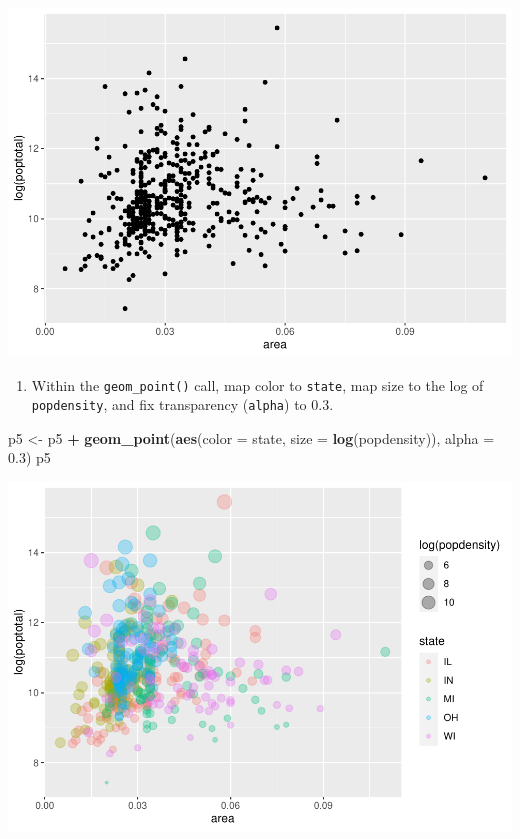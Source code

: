 \documentclass[
]{book}
\newenvironment{Shaded}{\begin{snugshade}}{\end{snugshade}}
\newcommand{\DataTypeTok}[1]{\textcolor[rgb]{0.13,0.29,0.53}{#1}}
\newcommand{\FloatTok}[1]{\textcolor[rgb]{0.00,0.00,0.81}{#1}}
\newcommand{\KeywordTok}[1]{\textcolor[rgb]{0.13,0.29,0.53}{\textbf{#1}}}
\newcommand{\NormalTok}[1]{#1}
\newcommand{\OperatorTok}[1]{\textcolor[rgb]{0.81,0.36,0.00}{\textbf{#1}}}
\newcommand{\StringTok}[1]{\textcolor[rgb]{0.31,0.60,0.02}{#1}}
\providecommand{\tightlist}{%
  \setlength{\itemsep}{0pt}\setlength{\parskip}{0pt}}
\begin{document}
\begin{alert}
\includegraphics{R/Rgraphics/figures/unnamed-chunk-228-1.pdf}

\begin{enumerate}
\def\labelenumi{\arabic{enumi}.}
\setcounter{enumi}{1}
\tightlist
\item
  Within the \texttt{geom\_point()} call, map color to \texttt{state}, map size to the log of \texttt{popdensity}, and fix transparency (\texttt{alpha}) to 0.3.
\end{enumerate}

\begin{Shaded}
\begin{Highlighting}[]
\NormalTok{p5 \textless{}{-}}\StringTok{ }\NormalTok{p5 }\OperatorTok{+}\StringTok{ }\KeywordTok{geom\_point}\NormalTok{(}\KeywordTok{aes}\NormalTok{(}\DataTypeTok{color =}\NormalTok{ state, }\DataTypeTok{size =} \KeywordTok{log}\NormalTok{(popdensity)), }\DataTypeTok{alpha =} \FloatTok{0.3}\NormalTok{) }
\NormalTok{p5}
\end{Highlighting}
\end{Shaded}

\includegraphics{R/Rgraphics/figures/unnamed-chunk-229-1.pdf}


\end{alert}
\end{document}
